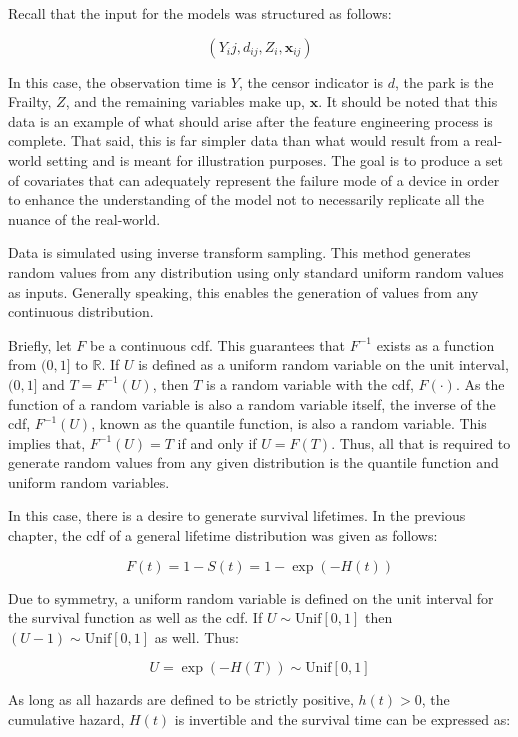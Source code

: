 Recall that the input for the models was structured as follows:

$$ (Y_ij, d_{ij}, Z_i,  \textbf{x}_{ij}) $$

In this case, the observation time is $Y$, the censor indicator is $d$, the park is the Frailty, $Z$, and the remaining variables make up, $\textbf{x}$. It should be noted that this data is an example of what should arise after the feature engineering process is complete. That said, this is far simpler data than what would result from a real-world setting and is meant for illustration purposes. The goal is to produce a set of covariates that can adequately represent the failure mode of a device in order to enhance the understanding of the model not to necessarily replicate all the nuance of the real-world.

Data is simulated using inverse transform sampling. This method generates random values from any distribution using only standard uniform random values as inputs. Generally speaking, this enables the generation of values from any continuous distribution. 

Briefly, let $F$ be a continuous cdf. This guarantees that $F^{-1}$ exists as a function from $(0,1]$ to $\mathbb{R}$. If $U$ is defined as a uniform random variable on the unit interval, $(0,1]$ and $T = F^{-1}(U)$, then $T$ is a random variable with the cdf, $F(\cdot)$. As the function of a random variable is also a random variable itself, the inverse of the cdf, $F^{-1}(U)$, known as the quantile function, is also a random variable\cite{Blitzstein2014}. This implies that, $F^{-1}(U) = T$ if and only if $U = F(T)$. Thus, all that is required to generate random values from any given distribution is the quantile function and uniform random variables. 

In this case, there is a desire to generate survival lifetimes. In the previous chapter, the cdf of a general lifetime distribution was given as follows:

$$ F(t) = 1 - S(t) = 1 - \exp(-H(t)) $$

Due to symmetry, a uniform random variable is defined on the unit interval for the survival function as well as the cdf. If $U \sim \text{Unif}[0,1]$ then $(U-1) \sim \text{Unif}[0,1]$ as well. Thus:

$$ U = \exp(-H(T)) \sim \text{Unif}[0,1] $$

As long as all hazards are defined to be strictly positive, $h(t) > 0$, the cumulative hazard, $H(t)$ is invertible and the survival time can be expressed as:

